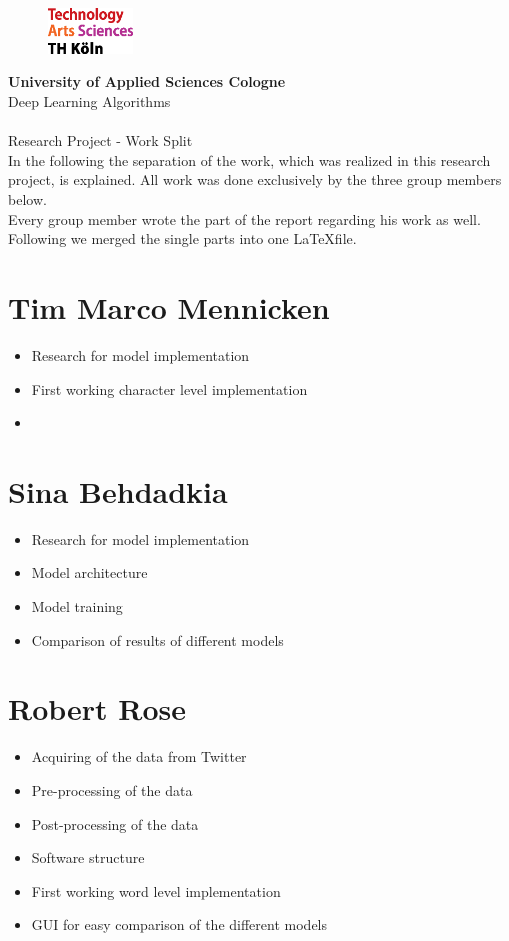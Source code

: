 \documentclass[a4paper,11pt,oneside]{article}
\begin{document}
  \pagestyle{fancy} %
  \fancyhead{}
  \fancyhf{}
  \renewcommand{\headrulewidth}{0pt}
  \renewcommand{\footrulewidth}{0.4pt}
  \fancyfoot[R] {}
  \begin{figure}
    \includegraphics[width=0.2\textwidth]{sources/logo_TH-Koeln_CMYK_22pt}
  \end{figure}
  \Large
  \textbf{University of Applied Sciences Cologne}\\
  Deep Learning Algorithms\\
  \\
  \large
  Research Project - Work Split\\

In the following the separation of the work, which was realized in this research project, is explained. All work was done exclusively by the three group members below.\\
Every group member wrote the part of the report regarding his work as well. Following we merged the single parts into one \LaTeX file.

\section*{Tim Marco Mennicken}

\begin{itemize}
\item Research for model implementation
\item First working character level implementation
\item 
\end{itemize}

\section*{Sina Behdadkia}

\begin{itemize}
\item Research for model implementation
\item Model architecture
\item Model training
\item Comparison of results of different models
\end{itemize}

\section*{Robert Rose}

\begin{itemize}
\item Acquiring of the data from Twitter
\item Pre-processing of the data
\item Post-processing of the data
\item Software structure
\item First working word level implementation
\item GUI for easy comparison of the different models
\end{itemize}
  
\end{document}

